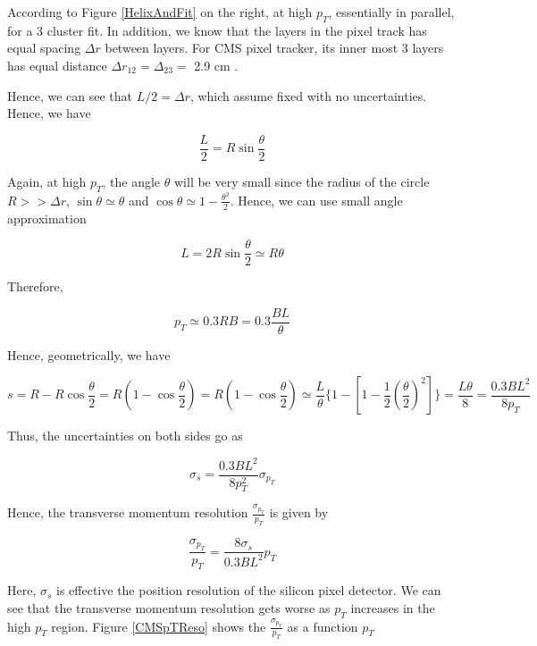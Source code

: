 According to Figure \ref{HelixAndFit} on the right, at high $p_T$, essentially in parallel, for a 3 cluster fit. In addition, we know that the layers in the pixel track has equal spacing $\Delta r$ between layers. For CMS pixel tracker, its inner most 3 layers has equal distance $\Delta r_{12} = \Delta_{23} =$ 2.9 cm \cite{CMSPIXInfo}. 


Hence, we can see that $L/2 = \Delta r$, which assume fixed with no uncertainties. Hence, we have

\begin{equation}
\frac{L}{2} = R \sin \frac{\theta}{2}
\end{equation}

Again, at high $p_T$, the angle $\theta$ will be very small since the radius of the circle $R >> \Delta r$, $\sin\theta \simeq \theta$ and $\cos\theta \simeq 1 - \frac{\theta^2}{2}$. Hence, we can use small angle approximation

\begin{equation}
L = 2 R \sin \frac{\theta}{2} \simeq R \theta
\end{equation}

Therefore,

\begin{equation}
p_T  \simeq 0.3 RB = 0.3 \frac{BL}{\theta}
\end{equation}


Hence, geometrically, we have


\begin{equation}
s = R - R \cos \frac{\theta}{2} = R (1 -  \cos \frac{\theta}{2}) =  R (1 -  \cos \frac{\theta}{2})  \simeq  \frac{L}{\theta} \{1 - [1 - \frac{1}{2} (\frac{\theta}{2})^2] \} =  \frac{L\theta}{8} = \frac{0.3BL^2}{8p_T}
\end{equation}

Thus, the uncertainties on both sides go as 

\begin{equation}
\sigma_s =  \frac{0.3BL^2}{8p_T^2} \sigma_{p_T}
\end{equation}

Hence, the transverse momentum resolution $\frac{\sigma_{p_T}}{p_T}$ is given by 


\begin{equation}
\frac{\sigma_{p_T}}{p_T} = \frac{8\sigma_s}{0.3BL^2} p_T
\end{equation}

Here, $\sigma_s$ is effective the position resolution of the silicon pixel detector. We can see that the transverse momentum resolution gets worse as $p_T$ increases in the high $p_T$ region. Figure \ref{CMSpTReso} shows the $\frac{\sigma_{p_T}}{p_T}$ as a function $p_T$



